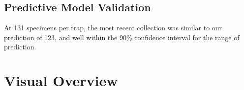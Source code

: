 \documentclass{article}
\begin{document}
\vspace{2mm}
\subsection*{Predictive Model Validation}


\begin{changemargin}{1.5cm}{1.5cm} 

At 131 specimens per trap, the most recent collection was similar to our prediction of 123, and well within the 90\% confidence interval for the range of prediction.

\end{changemargin}

\hrulefill


\fancyhfoffset[E,O]{0pt}


\section*{Visual Overview}
\hrulefill
\end{document}
